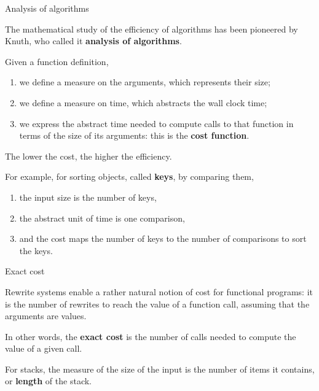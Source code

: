 %
\begin{frame}{Analysis of algorithms}

  The mathematical study of the efficiency of algorithms has been
  pioneered by Knuth, who called it \textbf{analysis of algorithms}.

  \bigskip

  Given a function definition,
  \begin{enumerate}

    \item we define a measure on the arguments, which represents their
      size;

    \item we define a measure on time, which abstracts the wall clock
      time;

    \item we express the abstract time needed to compute calls to that
      function in terms of the size of its arguments: this is the
      \textbf{cost function}.

  \end{enumerate}

  The lower the cost, the higher the efficiency.

  For example, for sorting objects, called \textbf{keys}, by comparing
  them,
  \begin{enumerate}

    \item the input size is the number of keys,

    \item the abstract unit of time is one comparison,

    \item and the cost maps the number of keys to the number of
      comparisons to sort the keys.

  \end{enumerate}

\end{frame}

%
\begin{frame}{Exact cost}

  Rewrite systems enable a rather natural notion of cost for
  functional programs: it is the number of rewrites to reach the value
  of a function call, assuming that the arguments are values.

  \bigskip

  In other words, the \textbf{exact cost} is the number of calls
  needed to compute the value of a given call.

  \bigskip

  For stacks, the measure of the size of the input is the number of
  items it contains, or \textbf{length} of the stack.

\end{frame}

